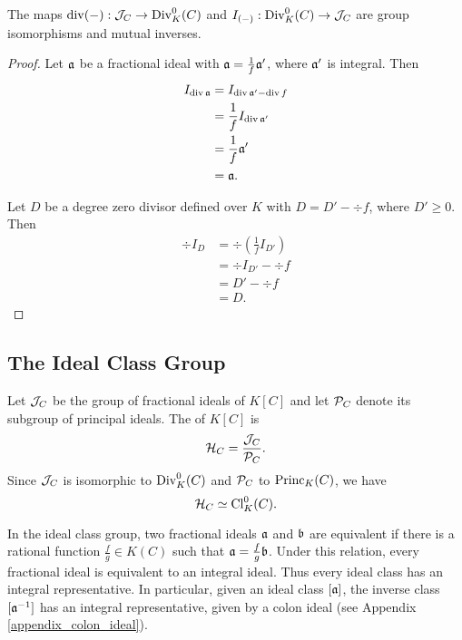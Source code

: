 \begin{theorem}
  The maps $\div(-) : \cal J_C \to \Div_K^0(C)$ and $I_{(-)} : \Div_K^0(C) \to \cal J_C$
  are group isomorphisms and mutual inverses.
\end{theorem}
\begin{proof}
  Let $\frak a$ be a fractional ideal with
  $\frak a = \frac 1 f \frak a'$,
  where $\frak a'$ is integral. Then
  \begin{align*}
    I_{\div \frak a}
      &= I_{\div \frak a' - \div f} \\
      &= \frac 1 f I_{\div \frak a'} \\
      &= \frac 1 f \frak a' \\
      &= \frak a.
  \end{align*}
  
  Let $D$ be a degree zero divisor defined over $K$ with
  $D = D' - \div f$, where $D' \geq 0$. Then
  \begin{align*}
    \div I_D
      &= \div \left( \frac 1 f I_{D'} \right) \\
      &= \div I_{D'} - \div f \\
      &= D' - \div f \\
      &= D.
  \end{align*}
\end{proof}




\subsection{The Ideal Class Group}

Let $\cal J_C$ be the group of fractional ideals of $K[C]$ and let $\cal P_C$ denote its subgroup of principal ideals.
The  of $K[C]$ is
\[ \cal H_C = \frac {\cal J_C} {\cal P_C}. \]
Since $\cal J_C$ is isomorphic to $\Div_K^0(C)$ and $\cal P_C$ to $\Princ_K(C)$, we have
\[ \cal H_C \simeq \Cl_K^0(C). \]

In the ideal class group, two fractional ideals $\frak a$ and $\frak b$ are equivalent
if there is a rational function $\frac f g \in K(C)$ such that $\frak a = \frac f g \frak b$.
Under this relation, every fractional ideal is equivalent to an integral ideal.
Thus every ideal class has an integral representative.
In particular, given an ideal class $[\frak a]$, the inverse class $[\frak a\inv]$ has an integral representative,
given by a colon ideal (see Appendix \ref{appendix_colon_ideal}).

